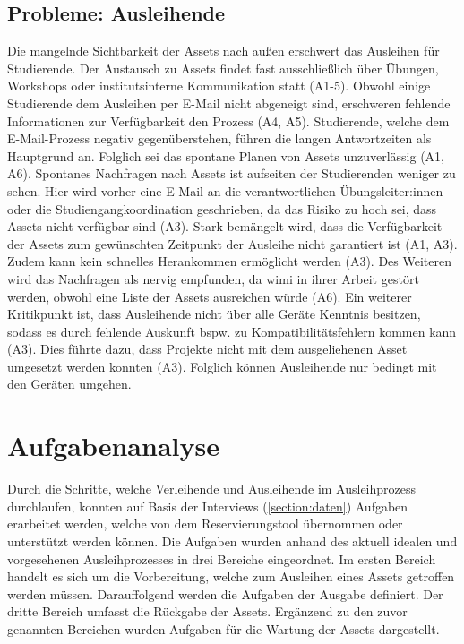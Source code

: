 \subsection{Probleme: Ausleihende}
\label{section:probleme-Ausleihende}
Die mangelnde Sichtbarkeit der Assets nach außen erschwert das Ausleihen für Studierende. Der
Austausch zu Assets findet fast ausschließlich über Übungen, Workshops oder institutsinterne
Kommunikation statt (A1-5). Obwohl einige Studierende dem Ausleihen per E-Mail nicht abgeneigt sind,
erschweren fehlende Informationen zur Verfügbarkeit den Prozess (A4, A5). Studierende, welche dem
E-Mail-Prozess negativ gegenüberstehen, führen die langen Antwortzeiten als Hauptgrund an. Folglich
sei das spontane Planen von Assets unzuverlässig (A1, A6). Spontanes Nachfragen nach Assets ist
aufseiten der Studierenden weniger zu sehen. Hier wird vorher eine E-Mail an die verantwortlichen
Übungsleiter:innen oder die Studiengangkoordination geschrieben, da das Risiko zu hoch sei, dass
Assets nicht verfügbar sind (A3). Stark bemängelt wird, dass die Verfügbarkeit der Assets zum
gewünschten Zeitpunkt der Ausleihe nicht garantiert ist (A1, A3). Zudem kann kein schnelles
Herankommen ermöglicht werden (A3). Des Weiteren wird das Nachfragen als nervig empfunden, da
\ac{wimi} in ihrer Arbeit gestört werden, obwohl eine Liste der Assets ausreichen würde (A6). Ein
weiterer Kritikpunkt ist, dass Ausleihende nicht über alle Geräte Kenntnis besitzen, sodass es durch
fehlende Auskunft bspw. zu Kompatibilitätsfehlern kommen kann (A3). Dies führte dazu, dass Projekte
nicht mit dem ausgeliehenen Asset umgesetzt werden konnten (A3). Folglich können Ausleihende nur
bedingt mit den Geräten umgehen.


\section{Aufgabenanalyse}
\label{section:aufgaben}
Durch die Schritte, welche Verleihende und Ausleihende im Ausleihprozess durchlaufen, konnten auf
Basis der Interviews (\ref{section:daten}) Aufgaben erarbeitet werden, welche von dem
Reservierungstool übernommen oder unterstützt werden können. Die Aufgaben wurden anhand des aktuell
idealen und vorgesehenen Ausleihprozesses in drei Bereiche eingeordnet. Im ersten Bereich handelt es
sich um die Vorbereitung, welche zum Ausleihen eines Assets getroffen werden müssen. Darauffolgend
werden die Aufgaben der Ausgabe definiert. Der dritte Bereich umfasst die Rückgabe der Assets.
Ergänzend zu den zuvor genannten Bereichen wurden Aufgaben für die Wartung der Assets dargestellt.

